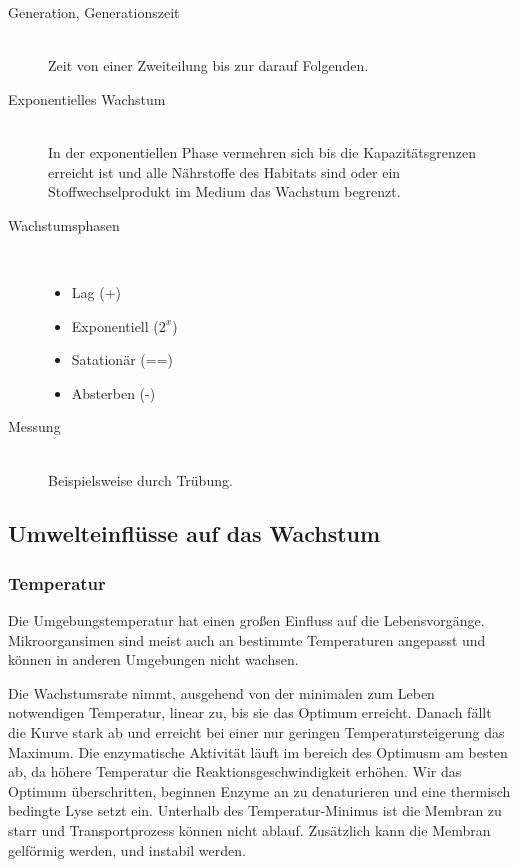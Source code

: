 \begin{description}
	\item[Generation, Generationszeit] \hfill \\
		Zeit von einer Zweiteilung bis zur darauf Folgenden.

	\item[Exponentielles Wachstum] \hfill \\
		In der exponentiellen Phase vermehren sich bis die 
		Kapazitätsgrenzen erreicht ist und alle Nährstoffe des Habitats sind
		oder ein Stoffwechselprodukt im Medium das Wachstum begrenzt.

	\item[Wachstumsphasen] \hfill \\
		\begin{itemize}
			\item Lag	(+)
			\item Exponentiell	($2^x$)
			\item Satationär	(==)
			\item Absterben	(-)
		\end{itemize}

	\item[Messung] \hfill \\
		Beispielsweise durch Trübung.

\end{description}

\subsection{Umwelteinflüsse auf das Wachstum}

\subsubsection*{Temperatur}

Die Umgebungstemperatur hat einen großen Einfluss auf die Lebensvorgänge.
Mikroorgansimen sind meist auch an bestimmte Temperaturen angepasst
und können in anderen Umgebungen nicht wachsen.

Die Wachstumsrate nimmt,
ausgehend von der minimalen zum Leben notwendigen Temperatur,
linear zu,
bis sie das Optimum erreicht.
Danach fällt die Kurve stark ab und
erreicht bei einer nur geringen Temperatursteigerung das Maximum.
Die enzymatische Aktivität läuft im bereich des Optimusm am besten ab,
da höhere Temperatur die Reaktionsgeschwindigkeit erhöhen.
Wir das Optimum überschritten,
beginnen Enzyme an zu denaturieren und eine thermisch bedingte Lyse setzt ein.
Unterhalb des Temperatur-Minimus ist die Membran zu starr 
und Transportprozess können nicht ablauf.
Zusätzlich kann die Membran gelförmig werden,
und instabil werden.


